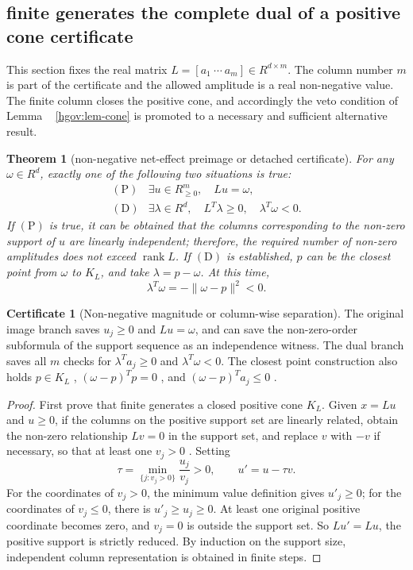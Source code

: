 \documentclass[12pt,a4paper,openany,notitlepage]{report}
\theoremstyle{plain}
\newtheorem{theorem}{Theorem}[chapter]
\theoremstyle{definition}
\newtheorem*{certificate}{Certificate}
\theoremstyle{remark}
\def\mathcal#1{#1}\def\mathsf#1{#1}\def\mathbb#1{#1}%
\begin{document}
\begin{CJK*}
\section { finite generates the complete dual of a positive cone certificate }\label{exp:hom:cone-alternative}


This section fixes the real matrix $L=[a_1\ \cdots\ a_m]\in\mathbb R^{d\times m}$. The column number $m$ is part of the certificate and the allowed amplitude is a real non-negative value. The finite column closes the positive cone, and accordingly the veto condition of Lemma ~ \ref{hgov:lem-cone} is promoted to a necessary and sufficient alternative result.

\begin{theorem}
[non-negative net-effect preimage or detached certificate]\label{exp:hom:finite-farkas}
For any $\omega\in\mathbb R^d$, exactly one of the following two situations is true: \[
 \begin{array}{ll}
 \mathrm{(P)}&
 \exists u\in\mathbb R_{\ge0}^m,\quad Lu=\omega,\\[2pt]
 \mathrm{(D)}&
 \exists\lambda\in\mathbb R^d,\quad
 L^{\mathsf T}\lambda\ge0,\quad
 \lambda^{\mathsf T}\omega<0.
 \end{array}
\] If $\mathrm{(P)}$ is true, it can be obtained that the columns corresponding to the non-zero support of $u$ are linearly independent; therefore, the required number of non-zero amplitudes does not exceed $\operatorname{rank}L$. If $\mathrm{(D)}$ is established, $p$ can be the closest point from $\omega$ to $\mathcal K_L$, and take $\lambda=p-\omega$. At this time, \[
 \lambda^{\mathsf T}\omega=-\|\omega-p\|^2<0.
\]\end{theorem}
\begin{certificate}
[Non-negative magnitude or column-wise separation]The original image branch saves $u_j\ge0$ and $Lu=\omega$, and can save the non-zero-order subformula of the support sequence as an independence witness. The dual branch saves all $m$ checks for $\lambda^{\mathsf T}a_j\ge0$ and $\lambda^{\mathsf T}\omega<0$. The closest point construction also holds $p\in\mathcal K_L$ , $(\omega-p)^{\mathsf T}p=0$ , and $(\omega-p)^{\mathsf T}a_j\le0$ .\end{certificate}
\begin{proof}
First prove that finite generates a closed positive cone $\mathcal K_L$. Given $x=Lu$ and $u\ge0$, if the columns on the positive support set are linearly related, obtain the non-zero relationship $Lv=0$ in the support set, and replace $v$ with $-v$ if necessary, so that at least one $v_j>0$ . Setting \[
 \tau=\min_{\{j:v_j>0\}}\frac{u_j}{v_j}>0,
 \qquad u'=u-\tau v.
\] For the coordinates of $v_j>0$, the minimum value definition gives $u'_j\ge0$; for the coordinates of $v_j\le0$, there is $u'_j\ge u_j\ge0$. At least one original positive coordinate becomes zero, and $v_j=0$ is outside the support set. So $Lu'=Lu$, the positive support is strictly reduced. By induction on the support size, independent column representation is obtained in finite steps.


\end{proof}
\end{CJK*}
\end{document}
